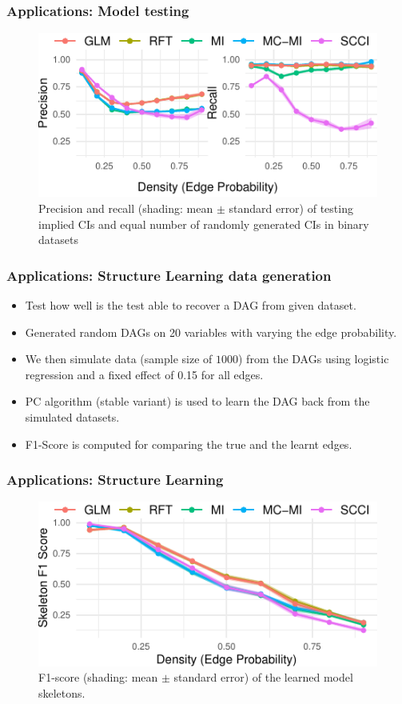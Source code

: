 \documentclass{beamer}
\begin{document}
\begin{frame}
	\frametitle{Applications: Model testing}
	\begin{figure}
		\centering
		\includegraphics{imgs/model_testing.pdf}
		\caption*{Precision and recall (shading: mean $\pm$ standard
		error) of testing implied CIs and equal number of randomly
		generated CIs in binary datasets}
	\end{figure}
\end{frame}

\begin{frame}
	\frametitle{Applications: Structure Learning data generation}
	\begin{itemize}
		\item Test how well is the test able to recover a DAG from given dataset.
		\item Generated random DAGs on 20 variables with varying the edge probability.
		\item We then simulate data (sample size of $1000 $) from the
			DAGs using logistic regression and a fixed effect of
			0.15 for all edges.
		\item PC algorithm (stable variant) is used to learn the DAG back from the simulated datasets.
		\item F1-Score is computed for comparing the true and the learnt edges.
	\end{itemize}
\end{frame}

\begin{frame}
	\frametitle{Applications: Structure Learning}
	\begin{figure}
		\centering
		\includegraphics{imgs/sl_density.pdf}
		\caption*{F1-score
		(shading: mean $\pm$ standard error) of the learned model
		skeletons.}
	\end{figure}
\end{frame}
\end{document}
